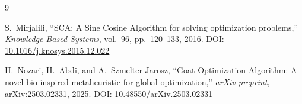 \documentclass[a4paper, 12pt]{article}
\begin{document}

\begin{thebibliography}{9}

S.~Mirjalili, ``SCA: A Sine Cosine Algorithm for solving optimization problems,'' \textit{Knowledge-Based Systems}, vol.~96, pp.~120--133, 2016.
\newline\href{https://doi.org/10.1016/j.knosys.2015.12.022}{DOI: 10.1016/j.knosys.2015.12.022}

H.~Nozari, H.~Abdi, and A.~Szmelter-Jarosz, ``Goat Optimization Algorithm: A novel bio-inspired metaheuristic for global optimization,'' \textit{arXiv preprint}, arXiv:2503.02331, 2025.
\newline\href{https://doi.org/10.48550/arXiv.2503.02331}{DOI: 10.48550/arXiv.2503.02331}

\end{thebibliography}
\end{document}
